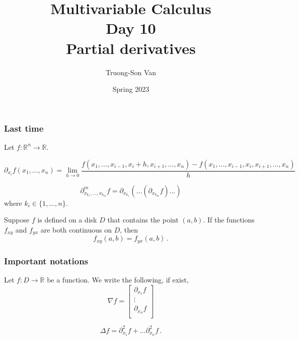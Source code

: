 \documentclass[aspectratio=169,handout]{beamer}
\title{ Multivariable Calculus \\ Day 10\\ Partial derivatives}
\institute{Fulbright University Vietnam}
\author{Truong-Son Van}
\date{Spring 2023}
\newcommand{\R}{\mathbb{R}}
\begin{document}
\maketitle


\begin{frame}
    \frametitle{Last time}
     
    Let
    $f: \mathbb{R}^n \to \R$.

\begin{equation*}
    \partial_{x_i} f(x_1, \dots, x_n) 
    = \lim_{h\to 0} \frac{ f(x_1, \dots, x_{i-1}, x_i + h , x_{i+1}, \dots, x_n) - f(x_1, \dots, x_{i-1}, x_i  , x_{i+1}, \dots, x_n)}{h} 
\end{equation*}

\begin{equation*}
    \partial^m_{x_{k_1}, \dots, x_{k_m}} f = \partial_{x_{k_1}} (\dots ( \partial_{x_{k_m}} f) \dots)
\end{equation*}
where $k_i \in \{1,\dots, n\}$.
\end{frame}



\begin{frame}
\begin{theorem}
Suppose \(f\) is defined on a disk \(D\) that contains the point \((a,b)\).
If the functions \(f_{xy}\) and \(f_{yx}\) are both continuous on \(D\), then
\begin{equation*}
    f_{xy}(a,b) = f_{yx}(a,b) \,.
\end{equation*}
\end{theorem}
\end{frame}


\begin{frame}
    \frametitle{Important notations}

Let \(f:D \to \mathbb{R}\) be a function. We write the following, if exist,
\begin{equation*}
    \nabla f = \begin{bmatrix}
        \partial_{x_1} f\\
        \vdots \\
        \partial_{x_n} f\\
    \end{bmatrix}
\end{equation*}

\begin{equation*}
    \Delta f = \partial_{x_1}^2 f + \dots \partial_{x_n}^2 f \,.
\end{equation*}
\end{frame}
\end{document}

